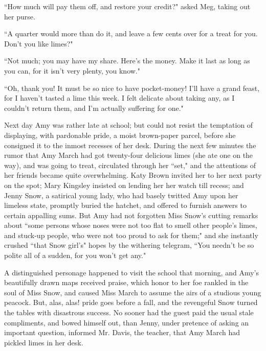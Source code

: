 ``How much will pay them off, and restore your credit?" asked Meg, taking
out her purse.

``A quarter would more than do it, and leave a few cents over for a treat
for you. Don't you like limes?"

``Not much; you may have my share. Here's the money. Make
it last as long as you can, for it isn't very plenty,
you know."

``Oh, thank you! It must be so nice to have pocket-money!
I'll have a grand feast, for I haven't
tasted a lime this week. I felt delicate about taking any, as I
couldn't return them, and I'm actually
suffering for one."

Next day Amy was rather late at school; but could not resist the
temptation of displaying, with pardonable pride, a moist brown-paper
parcel, before she consigned it to the inmost recesses of her desk.
During the next few minutes the rumor that Amy March had got twenty-four
delicious limes (she ate one on the way), and was going to treat,
circulated through her ``set," and the attentions of her friends became
quite overwhelming. Katy Brown invited her to her next party on the
spot; Mary Kingsley insisted on lending her her watch till recess; and
Jenny Snow, a satirical young lady, who had basely twitted Amy upon her
limeless state, promptly buried the hatchet, and offered to furnish
answers to certain appalling sums. But Amy had not forgotten Miss
Snow's cutting remarks about ``some persons whose noses
were not too flat to smell other people's limes, and
stuck-up people, who were not too proud to ask for them;" and she
instantly crushed ``that Snow girl's" hopes by the
withering telegram, ``You needn't be so polite all of a
sudden, for you won't get any."

A distinguished personage happened to visit the school that morning, and
Amy's beautifully drawn maps received praise, which
honor to her foe rankled in the soul of Miss Snow, and caused Miss March
to assume the airs of a studious young peacock. But, alas, alas! pride
goes before a fall, and the revengeful Snow turned the tables with
disastrous success. No sooner had the guest paid the usual stale
compliments, and bowed himself out, than Jenny, under pretence of asking
an important question, informed Mr. Davis, the teacher, that Amy March
had pickled limes in her desk.


